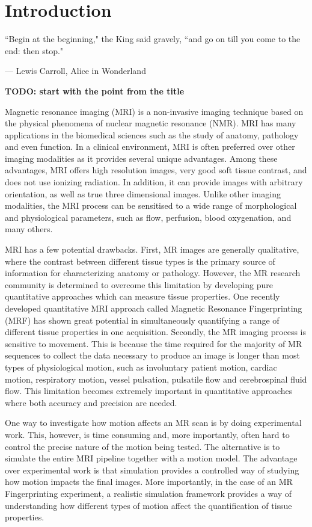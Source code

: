 \chapter{Introduction}
\label{chapterlabel1}
\epigraph{``Begin at the beginning," the King said gravely, ``and go on till you come to the end: then stop."}{--- \textup{Lewis Carroll}, Alice in Wonderland}

\textbf{TODO: start with the point from the title}

\hfill

Magnetic resonance imaging (MRI) is a non-invasive imaging technique based on the physical phenomena of nuclear magnetic resonance (NMR).
MRI has many applications in the biomedical sciences such as the study of anatomy, pathology and even function.
In a clinical environment, MRI is often preferred over other imaging modalities as it provides several unique advantages.
Among these advantages, MRI offers high resolution images, very good soft tissue contrast, and does not use ionizing radiation.
In addition, it can provide images with arbitrary orientation, as well as true three dimensional images.
Unlike other imaging modalities, the MRI process can be sensitised to a wide range of morphological and physiological parameters, such as flow, perfusion, blood oxygenation, and many others.

\hfill

MRI has a few potential drawbacks. 
First, MR images are generally qualitative, where the contrast between different tissue types is the primary source of information for characterizing anatomy or pathology. 
However, the MR research community is determined to overcome this limitation by developing pure quantitative approaches which can measure tissue properties.
One recently developed quantitative MRI approach called Magnetic Resonance Fingerprinting (MRF) has shown great potential in simultaneously quantifying a range of different tissue properties in one acquisition.
Secondly, the MR imaging process is sensitive to movement.
This is because the time required for the majority of MR sequences to collect the data necessary to produce an image is longer than most types of physiological motion, such as involuntary patient motion, cardiac motion, respiratory motion, vessel pulsation, pulsatile flow and cerebrospinal fluid flow.
This limitation becomes extremely important in quantitative approaches where both accuracy and precision are needed.

\hfill

One way to investigate how motion affects an MR scan is by doing experimental work.
This, however, is time consuming and, more importantly, often hard to control the precise nature of the motion being tested.
The alternative is to simulate the entire MRI pipeline together with a motion model. 
The advantage over experimental work is that simulation provides a controlled way of studying how motion impacts the final images.
More importantly, in the case of an MR Fingerprinting experiment, a realistic simulation framework provides a way of understanding how different types of motion affect the quantification of tissue properties.

